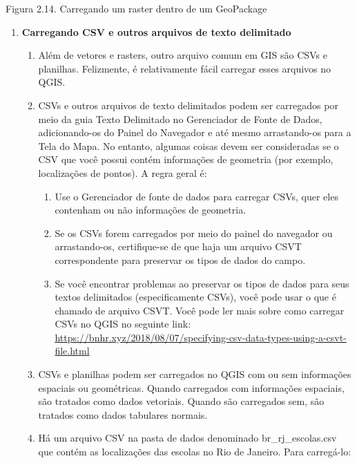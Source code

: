 \documentclass[
  portuguese,
]{krantz}
\providecommand{\tightlist}{%
  \setlength{\itemsep}{0pt}\setlength{\parskip}{0pt}}
\begin{document}
Figura 2.14. Carregando um raster dentro de um GeoPackage

\begin{enumerate}
\def\labelenumi{\arabic{enumi}.}
\setcounter{enumi}{3}
\item
  \textbf{Carregando CSV e outros arquivos de texto delimitado}

  \begin{enumerate}
  \def\labelenumii{\arabic{enumii}.}
  \item
    Além de vetores e rasters, outro arquivo comum em GIS são CSVs e planilhas. Felizmente, é relativamente fácil carregar esses arquivos no QGIS.
  \item
    CSVs e outros arquivos de texto delimitados podem ser carregados por meio da guia Texto Delimitado no Gerenciador de Fonte de Dados, adicionando-os do Painel do Navegador e até mesmo arrastando-os para a Tela do Mapa. No entanto, algumas coisas devem ser consideradas se o CSV que você possui contém informações de geometria (por exemplo, localizações de pontos). A regra geral é:

    \begin{enumerate}
    \def\labelenumiii{\arabic{enumiii}.}
    \tightlist
    \item
      Use o Gerenciador de fonte de dados para carregar CSVs, quer eles contenham ou não informações de geometria.
    \item
      Se os CSVs forem carregados por meio do painel do navegador ou arrastando-os, certifique-se de que haja um arquivo CSVT correspondente para preservar os tipos de dados do campo.
    \item
      Se você encontrar problemas ao preservar os tipos de dados para seus textos delimitados (especificamente CSVs), você pode usar o que é chamado de arquivo CSVT. Você pode ler mais sobre como carregar CSVs no QGIS no seguinte link: \href{https:\%20//bnhr.xyz/2018/08/07/specifying-csv-data-types-using-a-csvt-file.html}{https://bnhr.xyz/2018/08/07/specifying-csv-data-types-using-a-csvt-file.html}
    \end{enumerate}
  \item
    CSVs e planilhas podem ser carregados no QGIS com ou sem informações espaciais ou geométricas. Quando carregados com informações espaciais, são tratados como dados vetoriais. Quando são carregados sem, são tratados como dados tabulares normais.
  \item
    Há um arquivo CSV na pasta de dados denominado br\_rj\_escolas.csv que contém as localizações das escolas no Rio de Janeiro. Para carregá-lo:


\end{enumerate}
\end{enumerate}
\end{document}

